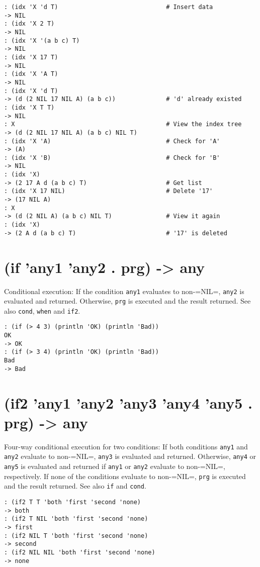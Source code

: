 {{{{{{\begin{verbatim}
: (idx 'X 'd T)                              # Insert data
-> NIL
: (idx 'X 2 T)
-> NIL
: (idx 'X '(a b c) T)
-> NIL
: (idx 'X 17 T)
-> NIL
: (idx 'X 'A T)
-> NIL
: (idx 'X 'd T)
-> (d (2 NIL 17 NIL A) (a b c))              # 'd' already existed
: (idx 'X T T)
-> NIL
: X                                          # View the index tree
-> (d (2 NIL 17 NIL A) (a b c) NIL T)
: (idx 'X 'A)                                # Check for 'A'
-> (A)
: (idx 'X 'B)                                # Check for 'B'
-> NIL
: (idx 'X)
-> (2 17 A d (a b c) T)                      # Get list
: (idx 'X 17 NIL)                            # Delete '17'
-> (17 NIL A)
: X
-> (d (2 NIL A) (a b c) NIL T)               # View it again
: (idx 'X)
-> (2 A d (a b c) T)                         # '17' is deleted
\end{verbatim}

 
\section{(if 'any1 'any2 . prg) -> any}
\label{sec-8-1-9-5}


Conditional execution: If the condition \texttt{any1} evaluates to non-=NIL=,
\texttt{any2} is evaluated and returned. Otherwise, \texttt{prg} is executed and the
result returned. See also \texttt{cond}, \texttt{when} and \texttt{if2}.


\begin{verbatim}
: (if (> 4 3) (println 'OK) (println 'Bad))
OK
-> OK
: (if (> 3 4) (println 'OK) (println 'Bad))
Bad
-> Bad
\end{verbatim}

 
\section{(if2 'any1 'any2 'any3 'any4 'any5 . prg) -> any}
\label{sec-8-1-9-6}


Four-way conditional execution for two conditions: If both conditions
\texttt{any1} and \texttt{any2} evaluate to non-=NIL=, \texttt{any3} is evaluated and
returned. Otherwise, \texttt{any4} or \texttt{any5} is evaluated and returned if
\texttt{any1} or \texttt{any2} evaluate to non-=NIL=, respectively. If none of the
conditions evaluate to non-=NIL=, \texttt{prg} is executed and the result
returned. See also \texttt{if} and \texttt{cond}.


\begin{verbatim}
: (if2 T T 'both 'first 'second 'none)
-> both
: (if2 T NIL 'both 'first 'second 'none)
-> first
: (if2 NIL T 'both 'first 'second 'none)
-> second
: (if2 NIL NIL 'both 'first 'second 'none)
-> none
\end{verbatim}

}}}}}}
